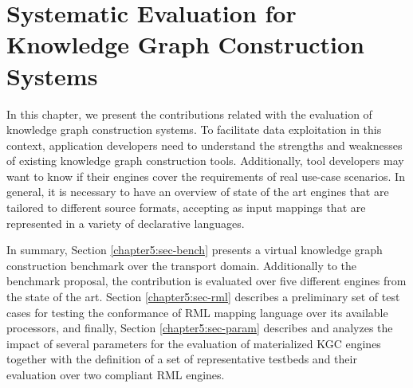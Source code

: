 \chapter{Systematic Evaluation for Knowledge Graph Construction Systems}
\label{chapter:evaluation}
In this chapter, we present the contributions related with the evaluation of knowledge graph construction systems. To facilitate data exploitation in this context, application developers need to understand the strengths and weaknesses of existing knowledge graph construction tools. Additionally, tool developers may want to know if their engines cover the requirements of real use-case scenarios. In general, it is necessary to have an overview of state of the art engines that are tailored to different source formats, accepting as input mappings that are represented in a variety of declarative languages. 

In summary, Section \ref{chapter5:sec-bench} presents a virtual knowledge graph construction benchmark over the transport domain. Additionally to the benchmark proposal, the contribution is evaluated over five different engines from the state of the art. Section \ref{chapter5:sec-rml} describes a preliminary set of test cases for testing the conformance of RML mapping language over its available processors, and finally, Section \ref{chapter5:sec-param} describes and analyzes the impact of several parameters for the evaluation of materialized KGC engines together with the definition of a set of representative testbeds and their evaluation over two compliant RML engines.







